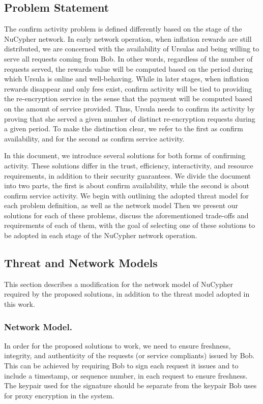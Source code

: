 \subsection{Problem Statement}
The confirm activity problem is defined differently based on the stage of the 
NuCypher network. In early network operation, when inflation rewards are 
still distributed, we are concerned with the availability of Ursulas and being willing to 
serve all requests coming from Bob. In other words, regardless of the number of 
requests served, the rewards value will be computed based on the period during which Ursula 
is online and well-behaving. While in later stages, when inflation rewards disappear 
and only fees exist, confirm activity will be tied to providing the re-encryption 
service in the sense that the payment will be computed based on the amount of 
service provided. Thus, Ursula needs to confirm its activity by proving that she served 
a given number of distinct re-encryption requests during a given period. To make the distinction 
clear, we refer to the first as confirm availability, and for the second as confirm 
service activity.


In this document, we introduce several solutions for both forms of confirming activity. 
These solutions differ in the trust, efficiency, interactivity, and resource 
requirements, in addition to their security guarantees. We divide the document into 
two parts, the first is about confirm availability, while the second is about confirm 
service activity. We begin with outlining the adopted threat model for each problem 
definition, as well as the network model Then we present our solutions for each 
of these problems, discuss the aforementioned
trade-offs and requirements of each of them, with the goal of selecting one of these 
solutions to be adopted in each stage of the NuCypher network operation.


\subsection{Threat and Network Models}
\label{threat-network-model}
This section describes a modification for the network model of NuCypher 
required by the proposed solutions, in 
addition to the threat model adopted in this work.


\subsubsection{Network Model.}
In order for the proposed solutions to work, we need to ensure freshness, 
integrity, and authenticity of the requests (or service compliants) issued by Bob. This can be achieved 
by requiring Bob to sign each request it issues and to include a timestamp, or 
sequence number, in each request to ensure freshness. The keypair used for the 
signature should be separate from the keypair Bob uses for proxy encryption in the 
system. 


